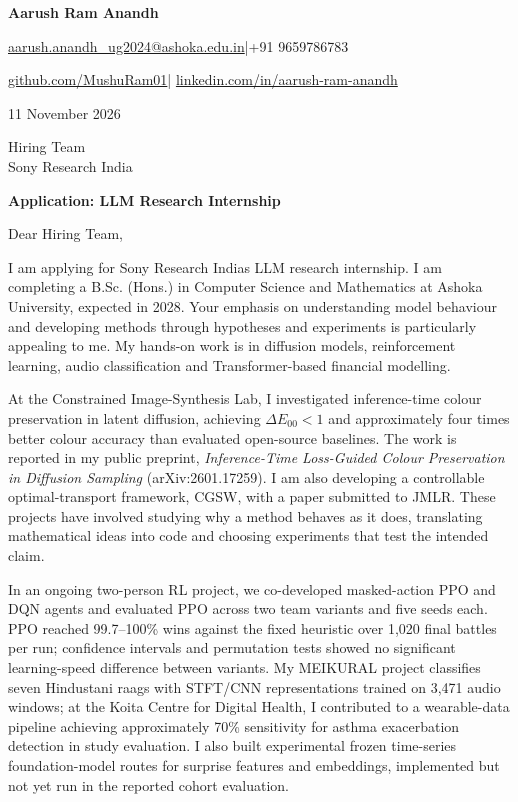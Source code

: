 \documentclass[11pt,a4paper]{article}
\begin{document}
{\LARGE\bfseries Aarush Ram Anandh}\par\vspace{4pt}
\href{mailto:aarush.anandh_ug2024@ashoka.edu.in}{aarush.anandh\_ug2024@ashoka.edu.in}\quad|\quad +91 9659786783\par\vspace{2pt}
\href{https://github.com/MushuRam01}{github.com/MushuRam01}\quad|\quad
\href{https://www.linkedin.com/in/aarush-ram-anandh/}{linkedin.com/in/aarush-ram-anandh}\par
\vspace{20pt}
11 November 2026\par\vspace{12pt}
Hiring Team\\
Sony Research India\par\vspace{12pt}
\textbf{Application: LLM Research Internship}\par\vspace{14pt}
Dear Hiring Team,\par\vspace{10pt}
I am applying for Sony Research India\textquotesingle s LLM research internship. I am completing a B.Sc. (Hons.) in Computer Science and Mathematics at Ashoka University, expected in 2028. Your emphasis on understanding model behaviour and developing methods through hypotheses and experiments is particularly appealing to me. My hands-on work is in diffusion models, reinforcement learning, audio classification and Transformer-based financial modelling.\par\vspace{10pt}
At the Constrained Image-Synthesis Lab, I investigated inference-time colour preservation in latent diffusion, achieving $\Delta E_{00}<1$ and approximately four times better colour accuracy than evaluated open-source baselines. The work is reported in my public preprint, \textit{Inference-Time Loss-Guided Colour Preservation in Diffusion Sampling} (arXiv:2601.17259). I am also developing a controllable optimal-transport framework, CGSW, with a paper submitted to JMLR. These projects have involved studying why a method behaves as it does, translating mathematical ideas into code and choosing experiments that test the intended claim.\par\vspace{10pt}
In an ongoing two-person RL project, we co-developed masked-action PPO and DQN agents and evaluated PPO across two team variants and five seeds each. PPO reached 99.7--100\% wins against the fixed heuristic over 1,020 final battles per run; confidence intervals and permutation tests showed no significant learning-speed difference between variants. My MEIKURAL project classifies seven Hindustani raags with STFT/CNN representations trained on 3,471 audio windows; at the Koita Centre for Digital Health, I contributed to a wearable-data pipeline achieving approximately 70\% sensitivity for asthma exacerbation detection in study evaluation. I also built experimental frozen time-series foundation-model routes for surprise features and embeddings, implemented but not yet run in the reported cohort evaluation.\par\vspace{10pt}
\end{document}
